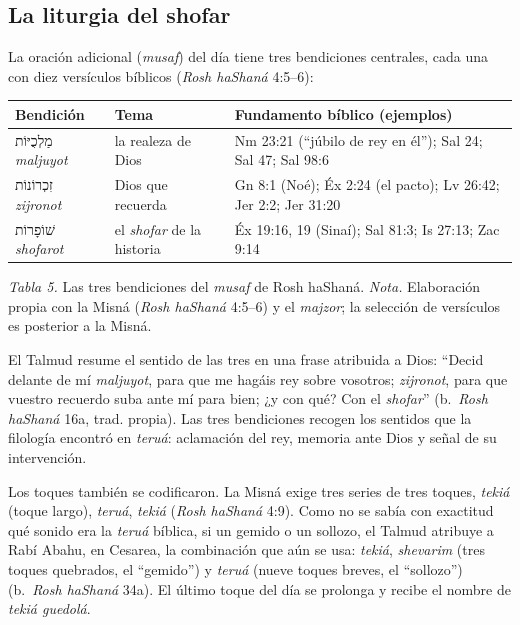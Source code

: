 \documentclass[11pt,letterpaper]{article}
\newcommand{\heb}[1]{\mbox{\foreignlanguage{hebrew}{#1}}}
\begin{document}
\subsection{La liturgia del shofar}
La oración adicional (\emph{musaf}) del día tiene tres bendiciones centrales, cada una con diez versículos bíblicos (\emph{Rosh haShaná} 4:5--6):

\begin{center}\begin{minipage}{\linewidth}\centering\small\renewcommand{\arraystretch}{1.18}
\begin{tabular}{@{}L{2.6cm}L{5.0cm}L{6.8cm}@{}}
\toprule
\textbf{Bendición} & \textbf{Tema} & \textbf{Fundamento bíblico (ejemplos)} \\ \midrule
\heb{מַלְכֻיּוֹת} \emph{maljuyot} & la realeza de Dios & Nm 23:21 (``júbilo de rey en él''); Sal 24; Sal 47; Sal 98:6 \\
\heb{זִכְרוֹנוֹת} \emph{zijronot} & Dios que recuerda & Gn 8:1 (Noé); Éx 2:24 (el pacto); Lv 26:42; Jer 2:2; Jer 31:20 \\
\heb{שׁוֹפָרוֹת} \emph{shofarot} & el \emph{shofar} de la historia & Éx 19:16, 19 (Sinaí); Sal 81:3; Is 27:13; Zac 9:14 \\
\bottomrule
\end{tabular}\par
{\footnotesize\color{sepia}\textit{Tabla 5.} Las tres bendiciones del \emph{musaf} de Rosh haShaná. \textit{Nota.} Elaboración propia con la Misná (\emph{Rosh haShaná} 4:5--6) y el \emph{majzor}; la selección de versículos es posterior a la Misná.}
\end{minipage}\end{center}

El Talmud resume el sentido de las tres en una frase atribuida a Dios: ``Decid delante de mí \emph{maljuyot}, para que me hagáis rey sobre vosotros; \emph{zijronot}, para que vuestro recuerdo suba ante mí para bien; ¿y con qué? Con el \emph{shofar}'' (b.~\emph{Rosh haShaná} 16a, trad. propia). Las tres bendiciones recogen los sentidos que la filología encontró en \emph{teruá}: aclamación del rey, memoria ante Dios y señal de su intervención.

Los toques también se codificaron. La Misná exige tres series de tres toques, \emph{tekiá} (toque largo), \emph{teruá}, \emph{tekiá} (\emph{Rosh haShaná} 4:9). Como no se sabía con exactitud qué sonido era la \emph{teruá} bíblica, si un gemido o un sollozo, el Talmud atribuye a Rabí Abahu, en Cesarea, la combinación que aún se usa: \emph{tekiá}, \emph{shevarim} (tres toques quebrados, el ``gemido'') y \emph{teruá} (nueve toques breves, el ``sollozo'') (b.~\emph{Rosh haShaná} 34a). El último toque del día se prolonga y recibe el nombre de \emph{tekiá guedolá}.
\end{document}
